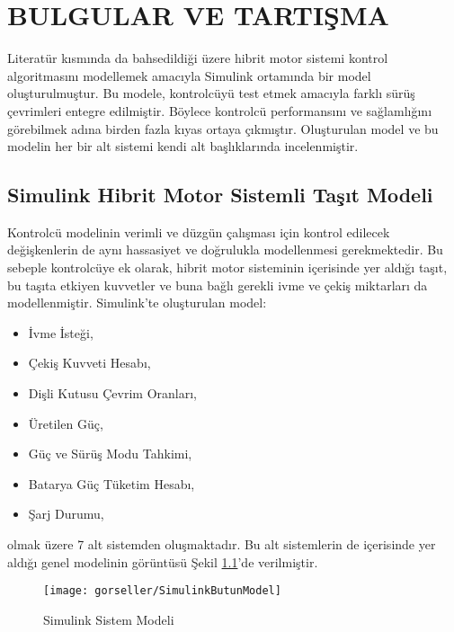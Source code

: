 \chapter{BULGULAR VE TARTIŞMA}
\label{bulgularvetartisma}
Literatür kısmında da bahsedildiği üzere hibrit motor sistemi kontrol algoritmasını modellemek amacıyla Simulink ortamında bir model oluşturulmuştur. Bu modele, kontrolcüyü
test etmek amacıyla farklı sürüş çevrimleri entegre edilmiştir. Böylece kontrolcü performansını ve sağlamlığını görebilmek adına birden fazla kıyas ortaya çıkmıştır. Oluşturulan model
ve bu modelin her bir alt sistemi kendi alt başlıklarında incelenmiştir. 

\section{Simulink Hibrit Motor Sistemli Taşıt Modeli}
\label{simhibmotsistasmod}
Kontrolcü modelinin verimli ve düzgün çalışması için kontrol edilecek değişkenlerin de aynı hassasiyet ve 
doğrulukla modellenmesi gerekmektedir. Bu sebeple kontrolcüye ek olarak, hibrit motor sisteminin içerisinde yer aldığı taşıt, bu taşıta etkiyen kuvvetler ve buna bağlı
gerekli ivme ve çekiş miktarları da modellenmiştir. Simulink'te oluşturulan model:
\begin{itemize}
    \item İvme İsteği,
    \item Çekiş Kuvveti Hesabı,
    \item Dişli Kutusu Çevrim Oranları,
    \item Üretilen Güç,
    \item Güç ve Sürüş Modu Tahkimi,
    \item Batarya Güç Tüketim Hesabı,
    \item Şarj Durumu,
\end{itemize} olmak üzere 7 alt sistemden oluşmaktadır. Bu alt sistemlerin de içerisinde yer aldığı genel modelinin görüntüsü  Şekil \ref{fig:SimulinkButunModel}'de verilmiştir.

\begin{landscape}

\begin{figure}[h]
    \centering
    \texttt{[image: gorseller/SimulinkButunModel]}
    \caption{Simulink Sistem Modeli}\label{fig:SimulinkButunModel}
\end{figure}

\end{landscape}

